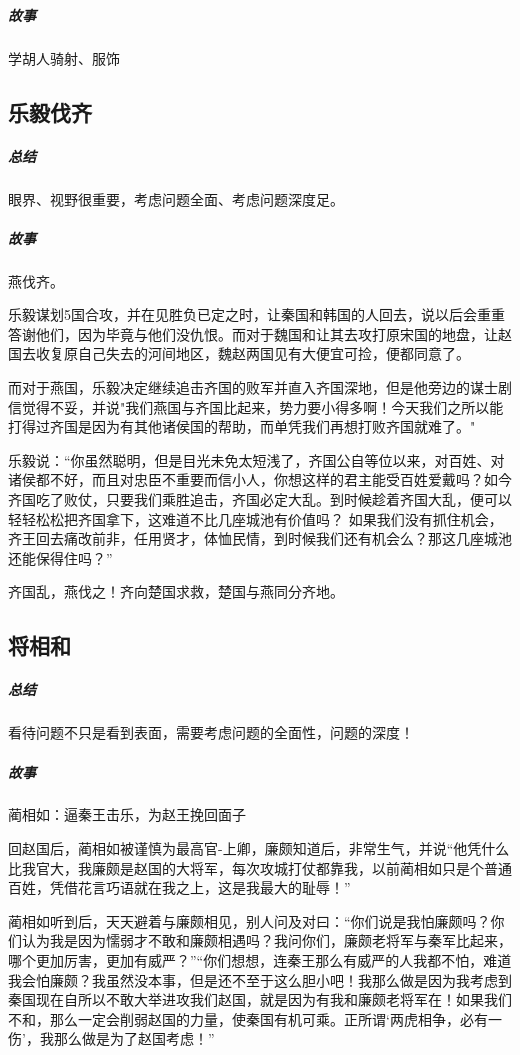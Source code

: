 \documentclass[UTF8,a4paper,8pt]{ctexbook}
\begin{document}
			\subparagraph{故事}
				学胡人骑射、服饰

		\subsection{乐毅伐齐}
			\subparagraph{总结}眼界、视野很重要，考虑问题全面、考虑问题深度足。
			
			\subparagraph{故事}
				燕伐齐。
				
				乐毅谋划5国合攻，并在见胜负已定之时，让秦国和韩国的人回去，说以后会重重答谢他们，因为毕竟与他们没仇恨。而对于魏国和让其去攻打原宋国的地盘，让赵国去收复原自己失去的河间地区，魏赵两国见有大便宜可捡，便都同意了。
				
				而对于燕国，乐毅决定继续追击齐国的败军并直入齐国深地，但是他旁边的谋士剧信觉得不妥，并说"我们燕国与齐国比起来，势力要小得多啊！今天我们之所以能打得过齐国是因为有其他诸侯国的帮助，而单凭我们再想打败齐国就难了。"
				
				乐毅说：“你虽然聪明，但是目光未免太短浅了，齐国公自等位以来，对百姓、对诸侯都不好，而且对忠臣不重要而信小人，你想这样的君主能受百姓爱戴吗？如今齐国吃了败仗，只要我们乘胜追击，齐国必定大乱。到时候趁着齐国大乱，便可以轻轻松松把齐国拿下，这难道不比几座城池有价值吗？ 如果我们没有抓住机会，齐王回去痛改前非，任用贤才，体恤民情，到时候我们还有机会么？那这几座城池还能保得住吗？”
				
				齐国乱，燕伐之！齐向楚国求救，楚国与燕同分齐地。
		
		\subsection{将相和}
			\subparagraph{总结}看待问题不只是看到表面，需要考虑问题的全面性，问题的深度！
			
			\subparagraph{故事}
				蔺相如：逼秦王击乐，为赵王挽回面子
				
				回赵国后，蔺相如被谨慎为最高官-上卿，廉颇知道后，非常生气，并说“他凭什么比我官大，我廉颇是赵国的大将军，每次攻城打仗都靠我，以前蔺相如只是个普通百姓，凭借花言巧语就在我之上，这是我最大的耻辱！”
				
				蔺相如听到后，天天避着与廉颇相见，别人问及对曰：“你们说是我怕廉颇吗？你们认为我是因为懦弱才不敢和廉颇相遇吗？我问你们，廉颇老将军与秦军比起来，哪个更加厉害，更加有威严？”“你们想想，连秦王那么有威严的人我都不怕，难道我会怕廉颇？我虽然没本事，但是还不至于这么胆小吧！我那么做是因为我考虑到秦国现在自所以不敢大举进攻我们赵国，就是因为有我和廉颇老将军在！如果我们不和，那么一定会削弱赵国的力量，使秦国有机可乘。正所谓‘两虎相争，必有一伤’，我那么做是为了赵国考虑！”
				
\end{document}
